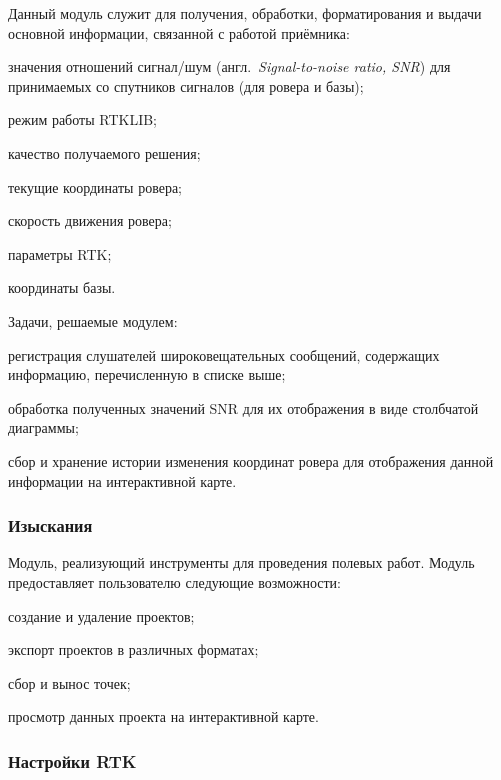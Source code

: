 Данный модуль служит для получения, обработки, форматирования и выдачи основной информации, связанной с работой приёмника:
\begin{dashitemize}
  \item значения отношений сигнал/шум (англ.~\emph{Signal-to-noise ratio, SNR}) для принимаемых со спутников сигналов (для ровера и базы);
  \item режим работы RTKLIB;
  \item качество получаемого решения;
  \item текущие координаты ровера;
  \item скорость движения ровера;
  \item параметры RTK;
  \item координаты базы.
\end{dashitemize}

Задачи, решаемые модулем:
\begin{dashitemize}
  \item регистрация слушателей широковещательных сообщений, содержащих информацию, перечисленную в списке выше;
  \item обработка полученных значений SNR для их отображения в виде столбчатой диаграммы;
  \item сбор и хранение истории изменения координат ровера для отображения данной информации на интерактивной карте.
\end{dashitemize}

\subsubsection{Изыскания}

Модуль, реализующий инструменты для проведения полевых работ. Модуль предоставляет пользователю следующие возможности:
\begin{dashitemize}
  \item создание и удаление проектов;
  \item экспорт проектов в различных форматах;
  \item сбор и вынос точек;
  \item просмотр данных проекта на интерактивной карте.
\end{dashitemize}

\subsubsection{Настройки RTK}

